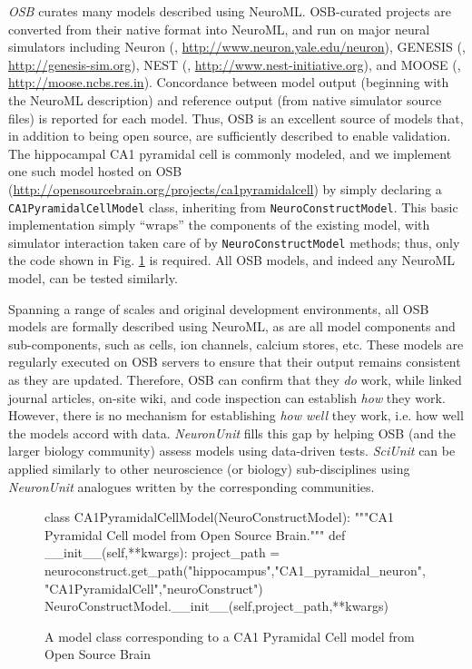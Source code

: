 \documentclass{frontiersSCNS}
\let\verbx\lstinline
\begin{document}
\textit{OSB} curates many models described using NeuroML. 
OSB-curated projects are converted from their native format into NeuroML, and run on major neural simulators including Neuron (\cite{carnevale_neuron_2006}, \url{http://www.neuron.yale.edu/neuron}), GENESIS (\cite{bower_genesis_2007}, \url{http://genesis-sim.org}), NEST (\cite{gewaltig_nest_2007}, \url{http://www.nest-initiative.org}), and MOOSE (\cite{ray_moose_2008}, \url{http://moose.ncbs.res.in}). 
Concordance between model output (beginning with the NeuroML description) and reference output (from native simulator source files) is reported for each model. 
Thus, OSB is an excellent source of models that, in addition to being open source, are sufficiently described to enable validation. 
The hippocampal CA1 pyramidal cell is commonly modeled, and we implement one such model hosted on OSB (\url{http://opensourcebrain.org/projects/ca1pyramidalcell}) by simply declaring a \verbx{CA1PyramidalCellModel} class, inheriting from \verbx{NeuroConstructModel}.  
This basic implementation simply ``wraps'' the components of the existing model, with simulator interaction taken care of by \verbx{NeuroConstructModel} methods; 
thus, only the code shown in Fig. \ref{fig:ca1_model} is required. 
All OSB models, and indeed any NeuroML model, can be tested similarly. 

Spanning a range of scales and original development environments, all OSB models are formally described using NeuroML, as are all model components and sub-components, such as cells, ion channels, calcium stores, etc. 
These models are regularly executed on OSB servers to ensure that their output remains consistent as they are updated. 
Therefore, OSB can confirm that they \textit{do} work, while linked journal articles, on-site wiki, and code inspection can establish \textit{how} they work. 
However, there is no mechanism for establishing \textit{how well} they work, i.e. how well the models accord with data. 
\textit{NeuronUnit} fills this gap by helping OSB (and the larger biology community) assess models using data-driven tests. 
\textit{SciUnit} can be applied similarly to other neuroscience (or biology) sub-disciplines using \textit{NeuronUnit} analogues written by the corresponding communities.    

\begin{figure}
\begin{python}
class CA1PyramidalCellModel(NeuroConstructModel):
	"""CA1 Pyramidal Cell model from Open Source Brain."""
	def __init__(self,**kwargs):
		project_path = neuroconstruct.get_path("hippocampus","CA1_pyramidal_neuron","CA1PyramidalCell","neuroConstruct")
		NeuroConstructModel.__init__(self,project_path,**kwargs)
\end{python}
\vspace{-5px}
\caption{A model class corresponding to a CA1 Pyramidal Cell model from Open Source Brain}
\label{fig:ca1_model}
\vspace{-15px}
\end{figure}
\end{document}
